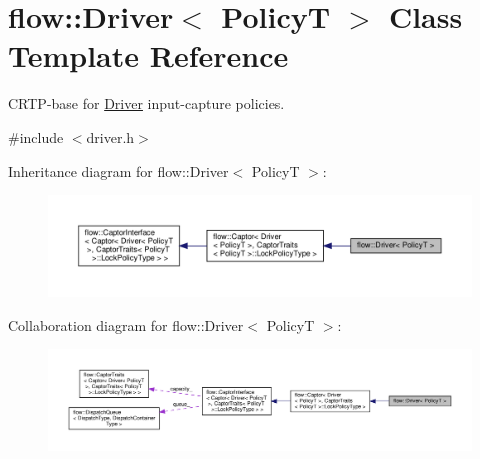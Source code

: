 \hypertarget{classflow_1_1_driver}{}\section{flow\+:\+:Driver$<$ PolicyT $>$ Class Template Reference}
\label{classflow_1_1_driver}


C\+R\+T\+P-\/base for \hyperlink{classflow_1_1_driver}{Driver} input-\/capture policies.  




{\ttfamily \#include $<$driver.\+h$>$}



Inheritance diagram for flow\+:\+:Driver$<$ PolicyT $>$\+:\nopagebreak
\begin{figure}[H]
\begin{center}
\leavevmode
\includegraphics[width=350pt]{classflow_1_1_driver__inherit__graph}
\end{center}
\end{figure}


Collaboration diagram for flow\+:\+:Driver$<$ PolicyT $>$\+:\nopagebreak
\begin{figure}[H]
\begin{center}
\leavevmode
\includegraphics[width=350pt]{classflow_1_1_driver__coll__graph}
\end{center}
\end{figure}
